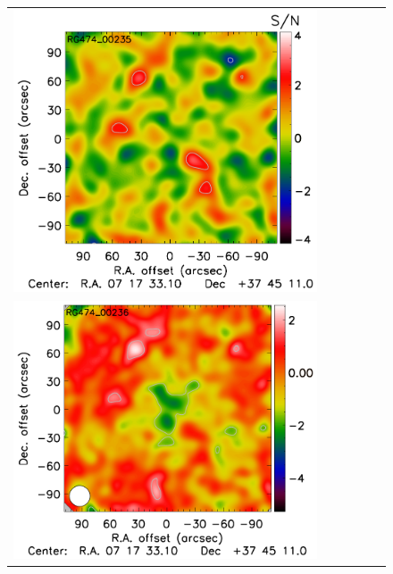 \documentclass[twocolumn,traditabstract]{aa}
\begin{document}
\begin{figure}[h]
{\begin{tabular}{llllll}
\includegraphics[trim=2.3cm 2.2cm 0cm 0cm, clip=true, scale=1]{Figure/TFcheckDoG_RG474_00235_Ymap_zobs0p4_15_15_45.pdf} \\
\includegraphics[trim=0cm 0.7cm 0cm 0cm, clip=true, scale=1]{Figure/Map_RG474_00236_Ymap_zobs0p4_processed_conv.pdf} & 

\end{tabular}}
\end{figure}
\end{document}
